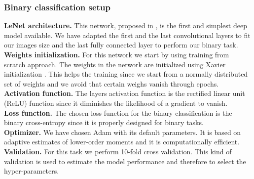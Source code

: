 \subsubsection{Binary classification setup}
\textbf{LeNet architecture.} This network, proposed in \cite{ref30}, is the first and simplest deep model available. We have adapted the first and the last convolutional layers to fit our images size and the last fully connected layer to perform our binary task.
\\
\textbf{Weights initialization.} For this network we start by using training from scratch approach. The weights in the network are initialized using Xavier initialization \cite{ref31}. This helps the training since we start from a normally distributed set of weights and we avoid that certain weighs vanish through epochs.
\\
\textbf{Activation function.}
The layers activation function is the rectified linear unit (ReLU) function since it diminishes the likelihood of a gradient to vanish.
\\
\textbf{Loss function.}
The chosen loss function for the binary classification is the binary cross-entropy since it is properly designed for binary tasks.
\\
\textbf{Optimizer.}
We have chosen Adam with its default parameters. It is based on adaptive estimates of lower-order moments and it is computationally efficient.
\\
\textbf{Validation.}
For this task we perform 10-fold cross validation. This kind of validation is used to estimate the model performance and therefore to select the hyper-parameters.
